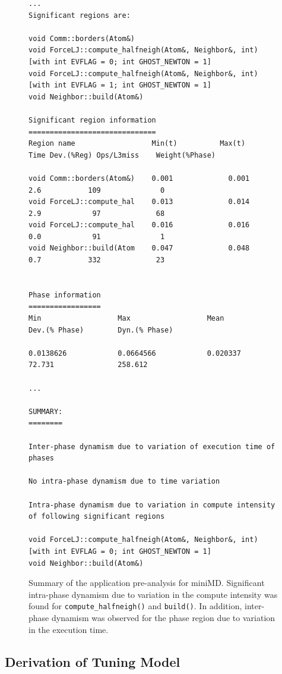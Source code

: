 \begin{figure}[!t]
\centering
\begin{lstlisting}
...
Significant regions are:

void Comm::borders(Atom&)
void ForceLJ::compute_halfneigh(Atom&, Neighbor&, int) [with int EVFLAG = 0; int GHOST_NEWTON = 1]
void ForceLJ::compute_halfneigh(Atom&, Neighbor&, int) [with int EVFLAG = 1; int GHOST_NEWTON = 1]
void Neighbor::build(Atom&)

Significant region information
==============================
Region name                  Min(t)          Max(t)       Time Dev.(%Reg) Ops/L3miss    Weight(%Phase)

void Comm::borders(Atom&)    0.001             0.001            2.6           109              0
void ForceLJ::compute_hal    0.013             0.014            2.9            97             68
void ForceLJ::compute_hal    0.016             0.016            0.0            91              1
void Neighbor::build(Atom    0.047             0.048            0.7           332             23


Phase information
=================
Min                  Max                  Mean                 Dev.(% Phase)        Dyn.(% Phase)

0.0138626            0.0664566            0.020337             72.731               258.612

...

SUMMARY:
========

Inter-phase dynamism due to variation of execution time of phases

No intra-phase dynamism due to time variation

Intra-phase dynamism due to variation in compute intensity of following significant regions

void ForceLJ::compute_halfneigh(Atom&, Neighbor&, int) [with int EVFLAG = 0; int GHOST_NEWTON = 1]
void Neighbor::build(Atom&)
\end{lstlisting}
\caption{Summary of the application pre-analysis for miniMD. Significant intra-phase dynamism due to variation in the compute intensity was found for \texttt{compute\_halfneigh()} and \texttt{build()}. In addition, inter-phase dynamism was observed for the phase region due to variation in the execution time.}
\label{fig:pre-analysisOutput}
\end{figure}

\subsection{Derivation of Tuning Model}
\label{sec:tuning_model_generation}

